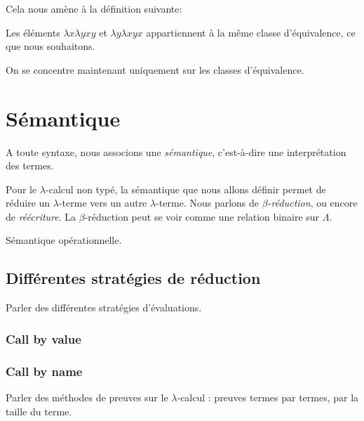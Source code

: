 Cela nous amène à la définition suivante:
\begin{definition} 
  
\end{definition}

Les éléments $\lambda x \lambda y xy$ et $\lambda y \lambda x yx$ appartiennent
à la même classe d'équivalence, ce que nous souhaitons.

On se concentre maintenant uniquement sur les classes d'équivalence.

\section{Sémantique}

A toute syntaxe, nous associons une \textit{sémantique}, c'est-à-dire une interprétation
des termes.

Pour le $\lambda$-calcul non typé, la sémantique que nous allons définir permet
de réduire un $\lambda$-terme vers un autre $\lambda$-terme. Nous parlons de
\textit{$\beta$-réduction}, ou encore de \textit{réécriture}. La
$\beta$-réduction peut se voir comme une relation binaire sur $\Lambda$.

Sémantique opérationnelle.

\subsection{Différentes stratégies de réduction}

Parler des différentes stratégies d'évaluations.

\subsubsection*{Call by value}
\subsubsection*{Call by name}

Parler des méthodes de preuves sur le $\lambda$-calcul : preuves termes par
termes, par la taille du terme.